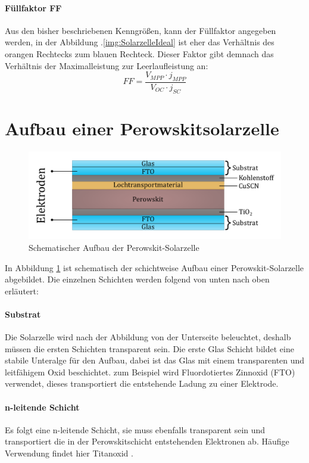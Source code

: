 \documentclass[12pt,a4paper,ngerman]{report}
\begin{document}
	\paragraph{Füllfaktor FF}
	Aus den bisher beschriebenen Kenngrößen, kann der Füllfaktor angegeben werden, in der Abbildung .\ref{img:SolarzelleIdeal} ist eher das Verhältnis des orangen Rechtecks zum blauen Rechteck. Dieser Faktor gibt demnach das Verhältnis der Maximalleistung zur Leerlaufleistung an:
	\begin{equation}
		FF = \frac{V_{MPP} \cdot j_{MPP}}{V_{OC} \cdot j_{SC}}
	\end{equation}  

	\section{Aufbau einer Perowskitsolarzelle}
		\begin{figure}[ht]
		\centering
		\includegraphics[width=\textwidth]{Bilder/AufbauZelle.pdf}		
		\caption[Aufbau der Perowskit-Solarzelle]{Schematischer Aufbau der Perowskit-Solarzelle}
		\label{img:AufbauZelle}
	\end{figure}
	In Abbildung \ref{img:AufbauZelle} ist schematisch der schichtweise Aufbau einer Perowskit-Solarzelle abgebildet. Die einzelnen Schichten werden folgend von unten nach oben erläutert:
	\paragraph{Substrat}
	Die Solarzelle wird nach der Abbildung von der Unterseite beleuchtet, deshalb müssen die ersten Schichten transparent sein. Die erste Glas Schicht bildet eine stabile Unteralge für den Aufbau, dabei ist das Glas mit einem transparenten und leitfähigem Oxid beschichtet. zum Beispiel wird Fluordotiertes Zinnoxid (FTO) verwendet, dieses transportiert die entstehende Ladung zu einer Elektrode.
	\paragraph{n-leitende Schicht}
	Es folgt eine n-leitende Schicht, sie muss ebenfalls transparent sein und transportiert die in der Perowskitschicht entstehenden Elektronen ab. Häufige Verwendung findet hier Titanoxid .
\end{document}
